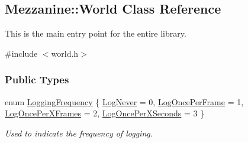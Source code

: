 \hypertarget{classMezzanine_1_1World}{
\subsection{Mezzanine::World Class Reference}
\label{classMezzanine_1_1World}
}


This is the main entry point for the entire library.  




{\ttfamily \#include $<$world.h$>$}

\subsubsection*{Public Types}
\begin{DoxyCompactItemize}
\item 
enum \hyperlink{classMezzanine_1_1World_a535c832832bbdebcdc623c3472a32e25}{LoggingFrequency} \{ \hyperlink{classMezzanine_1_1World_a535c832832bbdebcdc623c3472a32e25abf336536d5cf6396466067a847f64e3d}{LogNever} =  0, 
\hyperlink{classMezzanine_1_1World_a535c832832bbdebcdc623c3472a32e25ac1d6f9aa441fdc15961f28f18bbdbdb2}{LogOncePerFrame} =  1, 
\hyperlink{classMezzanine_1_1World_a535c832832bbdebcdc623c3472a32e25a1d4113b21efd91ab73056970906fafe5}{LogOncePerXFrames} =  2, 
\hyperlink{classMezzanine_1_1World_a535c832832bbdebcdc623c3472a32e25adf1caf2c27e4c4e6178c13e8579ab872}{LogOncePerXSeconds} =  3
 \}
\begin{DoxyCompactList}\small\item\em Used to indicate the frequency of logging. \item\end{DoxyCompactList}\end{DoxyCompactItemize}
